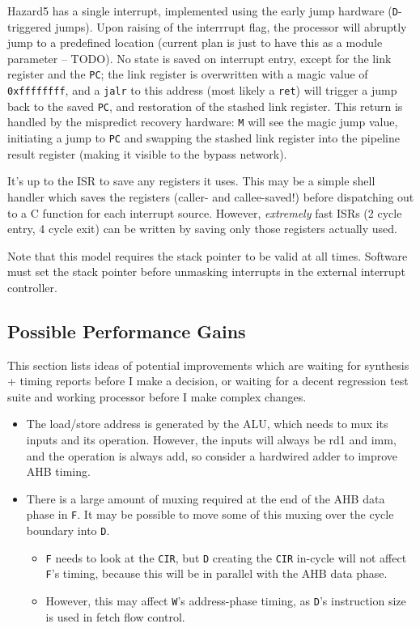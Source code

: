 \documentclass{article}
\begin{document}
Hazard5 has a single interrupt, implemented using the early jump hardware (\texttt{D}-triggered jumps). Upon raising of the interrrupt flag, the processor will abruptly jump to a predefined location (current plan is just to have this as a module parameter -- TODO). No state is saved on interrupt entry, except for the link register and the \texttt{PC}; the link register is overwritten with a magic value of \texttt{0xffffffff}, and a \texttt{jalr} to this address (most likely a \texttt{ret}) will trigger a jump back to the saved \texttt{PC}, and restoration of the stashed link register. This return is handled by the mispredict recovery hardware: \texttt{M} will see the magic jump value, initiating a jump to \texttt{PC} and swapping the stashed link register into the pipeline result register (making it visible to the bypass network).

It's up to the ISR to save any registers it uses. This may be a simple shell handler which saves the registers (caller- and callee-saved!) before dispatching out to a C function for each interrupt source. However, \textit{extremely} fast ISRs (2 cycle entry, 4 cycle exit) can be written by saving only those registers actually used.

Note that this model requires the stack pointer to be valid at all times. Software must set the stack pointer before unmasking interrupts in the external interrupt controller.

\subsection{Possible Performance Gains}

This section lists ideas of potential improvements which are waiting for synthesis + timing reports before I make a decision, or waiting for a decent regression test suite and working processor before I make complex changes.

\begin{itemize}
	\item The load/store address is generated by the ALU, which needs to mux its inputs and its operation. However, the inputs will always be rd1 and imm, and the operation is always add, so consider a hardwired adder to improve AHB timing.
	\item There is a large amount of muxing required at the end of the AHB data phase in \texttt{F}. It may be possible to move some of this muxing over the cycle boundary into \texttt{D}.
	\begin{itemize}
		\item \texttt{F} needs to look at the \texttt{CIR}, but \texttt{D} creating the \texttt{CIR} in-cycle will not affect \texttt{F}'s timing, because this will be in parallel with the AHB data phase.
		\item However, this may affect \texttt{W}'s address-phase timing, as \texttt{D}'s instruction size is used in fetch flow control.
	\end{itemize}
\end{itemize}
\end{document}
